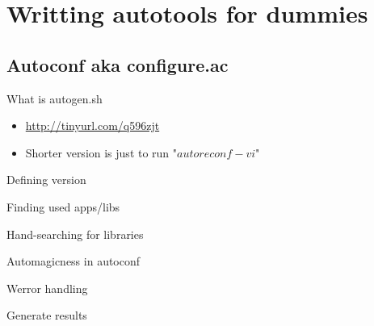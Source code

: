 \documentclass{beamer}
\begin{document}
\section{Writting autotools for dummies}

\subsection{Autoconf aka configure.ac}

\begin{frame}[t]{What is autogen.sh}
	\begin{itemize}
	\item \url{http://tinyurl.com/q596zjt} \\
	\item Shorter version is just to run "$autoreconf -vi$"
	\end{itemize}
\end{frame}

\begin{frame}[t]{Defining version}
	\begin{small}
	
	\end{small}
\end{frame}

\begin{frame}[t]{Finding used apps/libs}
	\begin{small}
	
	\end{small}
\end{frame}

\begin{frame}[t]{Hand-searching for libraries}
	\begin{small}
	
	\end{small}
\end{frame}

\begin{frame}[t]{Automagicness in autoconf}
	\begin{small}
	
	\end{small}
\end{frame}

\begin{frame}[t]{Werror handling}
	\begin{small}
	
	\end{small}
\end{frame}

\begin{frame}[t]{Generate results}
	\begin{small}
	
	\end{small}
\end{frame}
\end{document}
